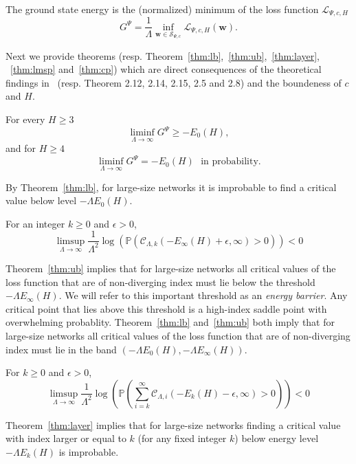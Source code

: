 \documentclass[twoside]{article}
\begin{document}
\begin{definition}
The ground state energy is the (normalized) minimum of the loss function $\mathcal{L}_{\Psi,c,H}$
\[G^\Psi = \frac{1}{\Lambda}\inf_{{\bm w}\in \mathcal{S}_{\Psi,c}}\mathcal{L}_{\Psi,c,H}({\bm w}).
\]
\end{definition}
Next we provide theorems (resp. Theorem~\ref{thm:lb},~\ref{thm:ub},~\ref{thm:layer}, ~\ref{thm:lmsp} and~\ref{thm:cp}) which are direct consequences of the theoretical findings in~\cite{AAC2010} (resp. Theorem 2.12, 2.14, 2.15, 2.5 and 2.8)  and the boundeness of $c$ and $H$.  
\begin{theorem}
For every $H \geq 3$
\[\liminf_{\Lambda \rightarrow \infty} G^\Psi \geq -E_0(H),
\]
and for $H \geq 4$
\[\liminf_{\Lambda \rightarrow \infty} G^\Psi = -E_0(H) \:\:\:\text{in probability.}
\]
\label{thm:lb}
\end{theorem}
By Theorem~\ref{thm:lb}, for large-size networks it is improbable to find a critical value below level $-\Lambda E_0(H)$.
\begin{theorem}
For an integer $k \geq 0$ and $\epsilon > 0$,
\[\limsup_{\Lambda \rightarrow \infty} \frac{1}{\Lambda^2}\log(\mathbb{P}(\mathcal{C}_{\Lambda,k}(-E_{\infty}(H) + \epsilon,\infty)>0)) < 0
\]
\label{thm:ub}
\end{theorem}
Theorem~\ref{thm:ub} implies that for large-size networks all critical values of the loss function that are of non-diverging index must lie below the threshold $-\Lambda E_{\infty}(H)$. We will refer to this important threshold as an \textit{energy barrier}. Any critical point that lies above this threshold is a high-index saddle point with overwhelming probablity. Theorem~\ref{thm:lb} and~\ref{thm:ub} both imply that for large-size networks all critical values of the loss function that are of non-diverging index must lie in the band $\left(-\Lambda E_0(H),-\Lambda E_{\infty}(H)\right)$.
\begin{theorem}
For $k \geq 0$ and $\epsilon > 0$,
\[\limsup_{\Lambda \rightarrow \infty} \frac{1}{\Lambda^2}\log(\mathbb{P}(\sum_{i=k}^{\infty}\!\mathcal{C}_{\Lambda,i}(-E_k(H) - \epsilon,\infty) \!>\! 0)) \!<\! 0
\]
\label{thm:layer}
\end{theorem}
Theorem~\ref{thm:layer} implies that for large-size networks finding a critical value with index larger or equal to $k$ (for any fixed integer $k$) below energy level $-\Lambda E_k(H)$ is improbable. 
\end{document}
